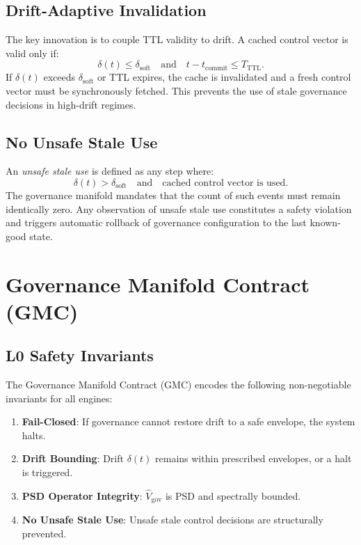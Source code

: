 \documentclass[11pt]{article}
\begin{document}
\subsection{Drift-Adaptive Invalidation}

The key innovation is to couple TTL validity to drift.
A cached control vector is valid only if:
\begin{equation}
  \delta(t) \le \delta_{\mathrm{soft}}
  \quad\text{and}\quad
  t - t_{\mathrm{commit}} \le T_{\mathrm{TTL}}.
\end{equation}
If $\delta(t)$ exceeds $\delta_{\mathrm{soft}}$ or TTL expires, the cache is invalidated and a fresh control vector must be synchronously fetched.
This prevents the use of stale governance decisions in high-drift regimes.

\subsection{No Unsafe Stale Use}

An \emph{unsafe stale use} is defined as any step where:
\begin{equation}
  \delta(t) > \delta_{\mathrm{soft}}
  \quad\text{and}\quad
  \text{cached control vector is used}.
\end{equation}
The governance manifold mandates that the count of such events must remain identically zero.
Any observation of unsafe stale use constitutes a safety violation and triggers automatic rollback of governance configuration to the last known-good state.

\section{Governance Manifold Contract (GMC)}

\subsection{L0 Safety Invariants}

The Governance Manifold Contract (GMC) encodes the following non-negotiable invariants for all engines:
\begin{enumerate}[label=(\roman*),noitemsep]
  \item \textbf{Fail-Closed}: If governance cannot restore drift to a safe envelope, the system halts.
  \item \textbf{Drift Bounding}: Drift $\delta(t)$ remains within prescribed envelopes, or a halt is triggered.
  \item \textbf{PSD Operator Integrity}: $\hat{V}_{\mathrm{gov}}$ is PSD and spectrally bounded.
  \item \textbf{No Unsafe Stale Use}: Unsafe stale control decisions are structurally prevented.
\end{enumerate}
\end{document}
